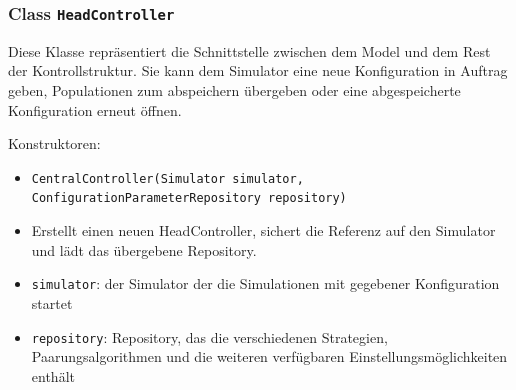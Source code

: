 \documentclass[parskip=full,11pt]{scrartcl}
\begin{document}
\subsubsection{Class \texttt{HeadController}}
Diese Klasse repräsentiert die Schnittstelle zwischen dem Model und dem Rest der Kontrollstruktur. Sie kann dem Simulator eine neue Konfiguration in Auftrag geben, Populationen zum abspeichern übergeben oder eine abgespeicherte Konfiguration erneut öffnen.

Konstruktoren:
\begin{itemize}\itemsep -10pt
\item \texttt{CentralController(Simulator simulator, ConfigurationParameterRepository repository)}
\item[] Erstellt einen neuen HeadController, sichert die Referenz auf den Simulator und lädt das übergebene Repository.
\item[] \texttt{simulator}: der Simulator der die Simulationen mit gegebener Konfiguration startet
\item[] \texttt{repository}: Repository, das die verschiedenen Strategien, Paarungsalgorithmen und die weiteren verfügbaren Einstellungsmöglichkeiten enthält
\end{itemize}
\end{document}
